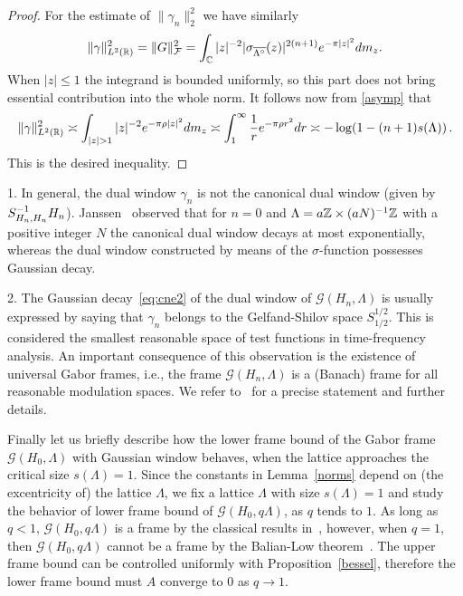 \documentclass[12pt]{amsart}
\begin{document}
\begin{proof}
For the estimate of $\|\gamma _n \|_2^2$ we have similarly
\[
\|\gamma\|_{L^2(\mathbb{R})}^2 = \|G\|^2_{\mathcal{F}} =
\int_{\mathbb{C}} |z|^{-2} |\sigma_{\overline{\Lambda^\circ}} (z)|^{2(n+1)} e^{-\pi |z|^2} dm_z.
\]
When $|z|\leq 1$  the integrand is bounded uniformly, %
 so this 
part does not bring essential contribution into the whole norm. It
follows now from  
\eqref{asymp} that
\begin{multline*}
\|\gamma\|_{L^2(\bR)}^2 \asymp 
\int_{|z|>1}|z|^{-2} e^{-\pi \rho  |z|^2 } dm_z  \asymp
 \int_1^\infty  \frac 1 r e^{-\pi \rho r^2} dr 
    \asymp  - \log (1-(n+1)s(\Lambda ))\, . %
 \end{multline*}
This is the desired inequality.
\end{proof}
 1. In general, the dual window $\gamma _n$ is not
the canonical dual window (given by $S_{H_n,H_n}^{-1}
H_n$). Janssen~\cite{janssen96} observed that for $n=0$ and $\Lambda = a\mathbb{Z}
\times (aN)^{-1} \mathbb{Z} $ with a positive integer $N$ the canonical dual
window decays at most exponentially, whereas the dual window
constructed by means of the $\sigma $-function possesses Gaussian
decay.       

2. The Gaussian decay~\eqref{eq:cne2} of the dual window of
$\mathcal{G}(H_n, \Lambda )$ is usually expressed by saying that
$\gamma _n$ belongs to the Gelfand-Shilov space $S^{1/2}_{1/2}$. This
is considered the smallest reasonable space of test functions in
time-frequency analysis. An important consequence of this observation
is the existence of universal Gabor frames, i.e., the frame
$\mathcal{G}(H_n, \Lambda )$  is a (Banach) frame for all reasonable
modulation spaces. We refer to~\cite{gro07c} for a precise statement
and further details. 


\vspace{ 3mm}

Finally let us briefly describe how the lower frame bound of the  Gabor
frame $\mathcal{G}(H_0, \Lambda )$ with Gaussian window behaves, when
the  lattice approaches  the critical size $s(\Lambda ) =1$.
Since the constants in Lemma~\ref{norms} depend on (the excentricity
of) the lattice $\Lambda $,   we fix a lattice $\Lambda $ with size
$s(\Lambda )=1$ and study the 
behavior of lower frame bound of $\mathcal{G}(H_0, q \Lambda )$,
as $q $ tends to $1$. As long as $q <1$,
$\mathcal{G}(H_0, q \Lambda )$ is a frame by the classical results
in~\cite{lyu,sw}, however, when $q  =1$, then
$\mathcal{G}(H_0, q \Lambda )$ cannot be a frame by the Balian-Low
theorem~\cite{BHW95}.  The upper frame bound can be controlled
uniformly with Proposition~\ref{bessel}, therefore    the lower frame
bound must $A$ 
converge to $0$ as $q \to 1$. 
\end{document}
